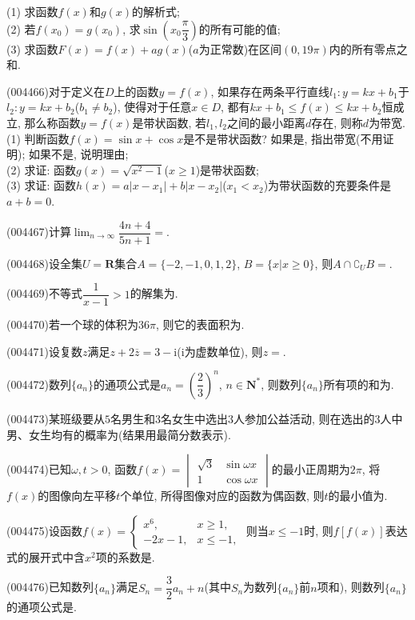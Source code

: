 (1) 求函数$f(x)$和$g(x)$的解析式;\\
(2) 若$f(x_0)=g(x_0)$, 求$\sin (x_0\dfrac\pi 3)$的所有可能的值;\\
(3) 求函数$F(x)=f(x)+ag(x)$($a$为正常数)在区间$(0,19\pi)$内的所有零点之和.
\item (004466)对于定义在$D$上的函数$y=f(x)$, 如果存在两条平行直线$l_1:y=kx+b_1$于$l_2:y=kx+b_2$($b_1\ne b_2$), 使得对于任意$x\in D$, 都有$kx+b_1\le f(x)\le kx+b_2$恒成立, 那么称函数$y=f(x)$是带状函数, 若$l_1,l_2$之间的最小距离$d$存在, 则称$d$为带宽.\\
(1) 判断函数$f(x)=\sin x+\cos x$是不是带状函数? 如果是, 指出带宽(不用证明); 如果不是, 说明理由;\\
(2) 求证: 函数$g(x)=\sqrt{x^2-1}$($x\ge 1$)是带状函数;\\
(3) 求证: 函数$h(x)=a|x-x_1|+b|x-x_2|$($x_1<x_2$)为带状函数的充要条件是$a+b=0$.
\item (004467)计算$\displaystyle \lim_{n\to\infty}\dfrac{4n+4}{5n+1}=$.
\item (004468)设全集$U=\mathbf{R}$集合$A=\{-2,-1,0,1,2\}$, $B=\{x|x\ge 0\}$, 则$A\cap \complement_UB=$.
\item (004469)不等式$\dfrac 1{x-1}>1$的解集为.
\item (004470)若一个球的体积为$36\pi$, 则它的表面积为.
\item (004471)设复数$z$满足$z+2\overline z=3-\mathrm{i}$($\mathrm{i}$为虚数单位), 则$z=$.
\item (004472)数列$\{a_n\}$的通项公式是$a_n=(\dfrac 23)^n$, $n\in \mathbf{N}^*$, 则数列$\{a_n\}$所有项的和为.
\item (004473)某班级要从$5$名男生和$3$名女生中选出$3$人参加公益活动, 则在选出的$3$人中男、女生均有的概率为(结果用最简分数表示).
\item (004474)已知$\omega,t>0$, 函数$f(x)=\begin{vmatrix}
\sqrt 3 & \sin \omega x  \\ 1  & \cos \omega x  \end{vmatrix}$的最小正周期为$2\pi$, 将$f(x)$的图像向左平移$t$个单位, 所得图像对应的函数为偶函数, 则$t$的最小值为.
\item (004475)设函数$f(x)=\begin{cases} x^6, &  x\ge 1,  \\ -2x-1, &  x\le -1,  \end{cases}$ 则当$x\le -1$时, 则$f[f(x)]$表达式的展开式中含$x^2$项的系数是.
\item (004476)已知数列$\{a_n\}$满足$S_n=\dfrac32a_n+n$(其中$S_n$为数列$\{a_n\}$前$n$项和), 则数列$\{a_n\}$的通项公式是.
